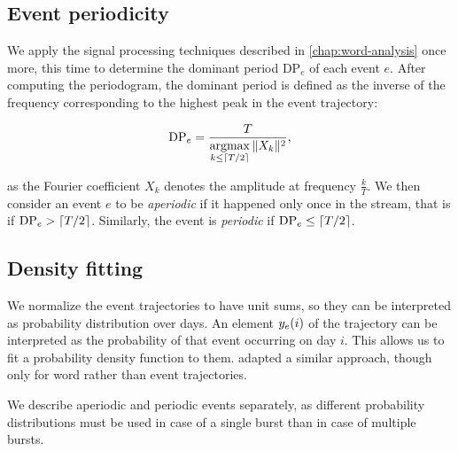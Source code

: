 \subsection{Event periodicity}
We apply the signal processing techniques described in \autoref{chap:word-analysis} once more, this time to determine the dominant period $\text{DP}_{e}$ of each event $e$. After computing the periodogram, the dominant period is defined as the inverse of the frequency corresponding to the highest peak in the event trajectory:

\begin{equation}
	\text{DP}_{e} = \frac{T}{\operatorname*{argmax}\limits_{k \leq \lceil T / 2\rceil}{\|X_{k}\|^{2}}},
\end{equation}

as the Fourier coefficient $X_{k}$ denotes the amplitude at frequency $\frac{k}{T}$. We then consider an event $e$ to be \textit{aperiodic} if it happened only once in the stream, that is if $\text{DP}_{e} > \lceil T / 2\rceil$. Similarly, the event is \textit{periodic} if $\text{DP}_{e} \leq \lceil T / 2\rceil$.

\subsection{Density fitting}
We normalize the event trajectories to have unit sums, so they can be interpreted as probability distribution over days. An element $y_{e}(i)$ of the trajectory can be interpreted as the probability of that event occurring on day $i$. This allows us to fit a probability density function to them. \cite{event-detection} adapted a similar approach, though only for word rather than event trajectories.

We describe aperiodic and periodic events separately, as different probability distributions must be used in case of a single burst than in case of multiple bursts.

